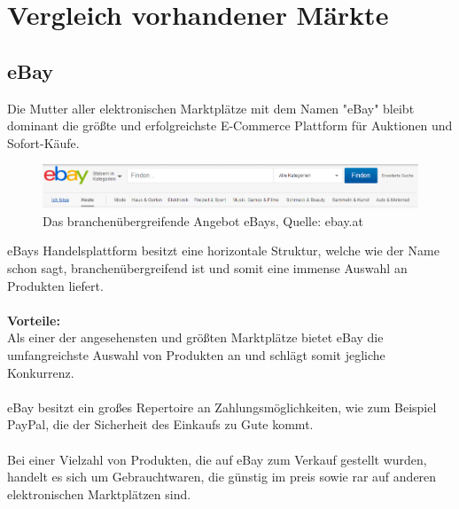 \documentclass[11pt,a4paper]{article}
\begin{document}
\section{Vergleich vorhandener Märkte}

\subsection{eBay}

Die Mutter aller elektronischen Marktplätze mit dem Namen "eBay" bleibt dominant die größte und erfolgreichste E-Commerce Plattform für Auktionen und Sofort-Käufe.

\begin{figure}[ht!]
	\centering
	\includegraphics[width=180mm]{ebay}
	\caption{Das branchenübergreifende Angebot eBays, Quelle: ebay.at \label{ebay}}
\end{figure}

\noindent eBays Handelsplattform besitzt eine horizontale Struktur, welche wie der Name schon sagt, branchenübergreifend ist und somit eine immense Auswahl an Produkten liefert. \\ \\

\noindent \textbf{Vorteile:} \\ 
Als einer der angesehensten und größten Marktplätze bietet eBay die umfangreichste Auswahl von Produkten an und schlägt somit jegliche Konkurrenz. \\ \\
eBay besitzt ein großes Repertoire an Zahlungsmöglichkeiten, wie zum Beispiel PayPal, die der Sicherheit des Einkaufs zu Gute kommt.
\\ \\
Bei einer Vielzahl von Produkten, die auf eBay zum Verkauf gestellt wurden, handelt es sich um Gebrauchtwaren, die günstig im preis sowie rar auf anderen elektronischen Marktplätzen sind.
\end{document}

